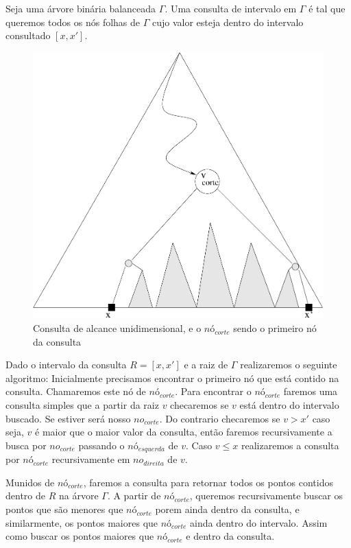 Seja uma árvore binária balanceada $\Gamma$. Uma consulta de intervalo em $\Gamma$ é tal que queremos
todos os nós folhas de $\Gamma$ cujo valor esteja dentro do intervalo consultado $[x, x']$.

\begin{figure}
    \begin{center}
        \includegraphics[scale=0.4]{images/range_tree2.pdf}
    \end{center}
    \caption{Consulta de alcance unidimensional, e o $nó_{corte}$ sendo o primeiro nó da consulta}
\end{figure}


Dado o intervalo da consulta $R = [x , x']$ e a raiz de $\Gamma$ realizaremos o seguinte algoritmo:
Inicialmente precisamos encontrar o primeiro nó que está contido na consulta. Chamaremos este nó de $nó_{corte}$.
Para encontrar o $nó_{corte}$ faremos uma consulta simples que a partir da raiz $v$ checaremos se $v$
está dentro do intervalo buscado. Se estiver será nosso $no_{corte}$. Do contrario checaremos se $v > x'$
caso seja, $v$ é maior que o maior valor da consulta, então faremos recursivamente a busca por $no_{corte}$
passando o $nó_{esquerda}$ de $v$. Caso $v \leq x$ realizaremos a consulta por $nó_{corte}$ recursivamente
em $no_{direita}$ de $v$.


Munidos de $nó_{corte}$, faremos a consulta para retornar todos os pontos contidos dentro de $R$ na árvore
$\Gamma$.
A partir de $nó_{corte}$, queremos recursivamente buscar os pontos que são menores que $nó_{corte}$ porem
ainda dentro da consulta, e similarmente, os pontos maiores que $nó_{corte}$ ainda dentro do intervalo.
Assim como buscar os pontos maiores que $nó_{corte}$ e dentro da consulta. \cite{cg_search1}

